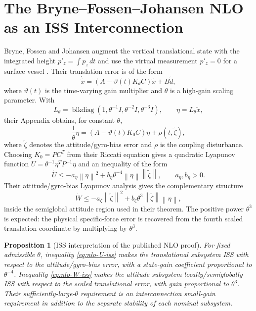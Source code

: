 \documentclass[conference]{IEEEtran}
\newcommand{\norm}[1]{\left\lVert#1\right\rVert}
\DeclareMathOperator{\blkdiag}{blkdiag}
\newtheorem{proposition}{Proposition}
\theoremstyle{remark}
\begin{document}
\section{The Bryne--Fossen--Johansen NLO as an ISS Interconnection}
\label{sec:nlo}

Bryne, Fossen and Johansen augment the vertical translational state with the
integrated height $p'_z=\int p_z\,dt$ and use the virtual measurement $p'_z=0$
for a surface vessel \cite{BryneFossenJohansen2014_TimeVarGain}.  Their
translation error is of the form
\begin{equation}
 \dot{\tilde x}=(A-\vartheta(t)K_\theta C)\tilde x+B\tilde d,
 \label{eq:nlo-x}
\end{equation}
where $\vartheta(t)$ is the time-varying gain multiplier and $\theta$ is a
high-gain scaling parameter.  With
\begin{equation}
 L_\theta=\blkdiag(1,\theta^{-1}I,
 \theta^{-2}I,\theta^{-3}I),
 \qquad \eta=L_\theta\tilde x,
 \label{eq:nlo-scaling}
\end{equation}
their Appendix obtains, for constant $\theta$,
\begin{equation}
 \frac{1}{\theta}\dot\eta
 =(A-\vartheta(t)K_0C)\eta+\rho(t,\tilde\zeta),
 \label{eq:nlo-scaled-error}
\end{equation}
where $\tilde\zeta$ denotes the attitude/gyro-bias error and
$\rho$ is the coupling disturbance.  Choosing $K_0=PC^T$ from their Riccati
equation gives a quadratic Lyapunov function
$U=\theta^{-1}\eta^TP^{-1}\eta$ and an inequality of the form
\begin{equation}
 \dot U
 \le-a_\eta\norm\eta^2
 +b_\eta\theta^{-4}\norm\eta\norm{\tilde\zeta},
 \qquad a_\eta,b_\eta>0.
 \label{eq:nlo-U-iss}
\end{equation}
Their attitude/gyro-bias Lyapunov analysis gives the complementary structure
\begin{equation}
 \dot W
 \le-a_\zeta\norm{\tilde\zeta}^2
 +b_\zeta\theta^{3}\norm{\tilde\zeta}\norm\eta,
 \label{eq:nlo-W-iss}
\end{equation}
inside the semiglobal attitude region used in their theorem.  The positive
power $\theta^3$ is expected: the physical specific-force error is recovered
from the fourth scaled translation coordinate by multiplying by $\theta^3$.

\begin{proposition}[ISS interpretation of the published NLO proof]
\label{prop:nlo-iss}
For fixed admissible $\theta$, inequality \eqref{eq:nlo-U-iss} makes the
translational subsystem ISS with respect to the attitude/gyro-bias error, with a
state-gain coefficient proportional to $\theta^{-4}$.  Inequality
\eqref{eq:nlo-W-iss} makes the attitude subsystem locally/semiglobally ISS with
respect to the scaled translational error, with gain proportional to
$\theta^3$.  Their sufficiently-large-$\theta$ requirement is an interconnection
small-gain requirement in addition to the separate stability of each nominal
subsystem.
\end{proposition}
\end{document}
